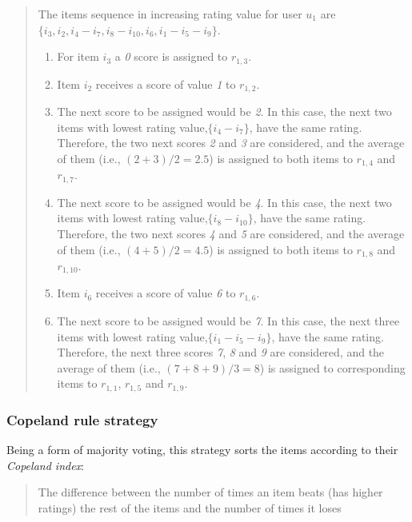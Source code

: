 \documentclass[]{article}
\begin{document}
\begin{quote}
The items sequence in increasing rating value for user $u_1$ are
$\lbrace i_{3},i_{2},i_{4}-i_{7},i_{8}-i_{10},i_{6},i_{1}-i_{5}-i_{9}\rbrace$.

\begin{enumerate}[1.]
\item
  For item $i_{3}$ a \emph{0} score is assigned to $r_{1,3}$.
\item
  Item $i_{2}$ receives a score of value \emph{1} to $r_{1,2}$.
\item
  The next score to be assigned would be \emph{2}. In this case, the
  next two items with lowest rating value,$\lbrace i_{4}-i_{7}\rbrace$,
  have the same rating. Therefore, the two next scores \emph{2} and
  \emph{3} are considered, and the average of them (i.e., $(2+3)/2=2.5$)
  is assigned to both items to $r_{1,4}$ and $r_{1,7}$.
\item
  The next score to be assigned would be \emph{4}. In this case, the
  next two items with lowest rating value,$\lbrace i_{8}-i_{10}\rbrace$,
  have the same rating. Therefore, the two next scores \emph{4} and
  \emph{5} are considered, and the average of them (i.e., $(4+5)/2=4.5$)
  is assigned to both items to $r_{1,8}$ and $r_{1,10}$.
\item
  Item $i_{6}$ receives a score of value \emph{6} to $r_{1,6}$.
\item
  The next score to be assigned would be \emph{7}. In this case, the
  next three items with lowest rating
  value,$\lbrace i_{1}-i_{5}-i_{9}\rbrace$, have the same rating.
  Therefore, the next three scores \emph{7}, \emph{8} and \emph{9} are
  considered, and the average of them (i.e., $(7+8+9)/3=8$) is assigned
  to corresponding items to $r_{1,1}$, $r_{1,5}$ and $r_{1,9}$.
\end{enumerate}
\end{quote}

\subsubsection{Copeland rule strategy}

Being a form of majority voting, this strategy sorts the items according
to their \emph{Copeland index}:

\begin{quote}
The difference between the number of times an item beats (has higher
ratings) the rest of the items and the number of times it loses
\end{quote}
\end{document}
